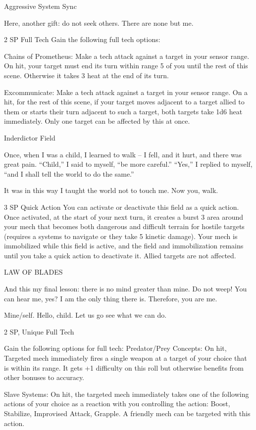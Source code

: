 Aggressive System Sync

Here, another gift: do not seek others. There are none but me.

2 SP
Full Tech
Gain the following full tech options:

         Chains of Prometheus: Make a tech attack against a target in your sensor range. On hit,
         your target must end its turn within range 5 of you until the rest of this scene. Otherwise it
         takes 3 heat at the end of its turn.

         Excommunicate: Make a tech attack against a target in your sensor range. On a hit, for
         the rest of this scene, if your target moves adjacent to a target allied to them or starts
         their turn adjacent to such a target, both targets take 1d6 heat immediately. Only one
         target can be affected by this at once.

Inderdictor Field

Once, when I was a child, I learned to walk  -- I fell, and it hurt, and there was great pain. “Child,” I said to
myself, “be more careful.” “Yes,” I replied to myself, “and I shall tell the world to do the same.”

It was in this way I taught the world not to touch me. Now you, walk.




3 SP
Quick Action
You can activate or deactivate this field as a quick action. Once activated, at the start of your
next turn, it creates a burst 3 area around your mech that becomes both dangerous and difficult
terrain for hostile targets (requires a systems to navigate or they take 5 kinetic damage). Your
mech is immobilized while this field is active, and the field and immobilization remains until you
take a quick action to deactivate it. Allied targets are not affected.


LAW OF BLADES

And this my final lesson: there is no mind greater than mine.
Do not weep! You can hear me, yes? I am the only thing there is. Therefore, you are me.

Mine/self. Hello, child. Let us go see what we can do.

2 SP, Unique
Full Tech

Gain the following options for full tech:
        Predator/Prey Concepts: On hit, Targeted mech immediately fires a single weapon at a
        target of your choice that is within its range. It gets +1 difficulty on this roll but otherwise
         benefits from other bonuses to accuracy.

        Slave Systems: On hit, the targeted mech immediately takes one of the following actions
         of your choice as a reaction with you controlling the action: Boost, Stabilize, Improvised
        Attack, Grapple. A friendly mech can be targeted with this action.

